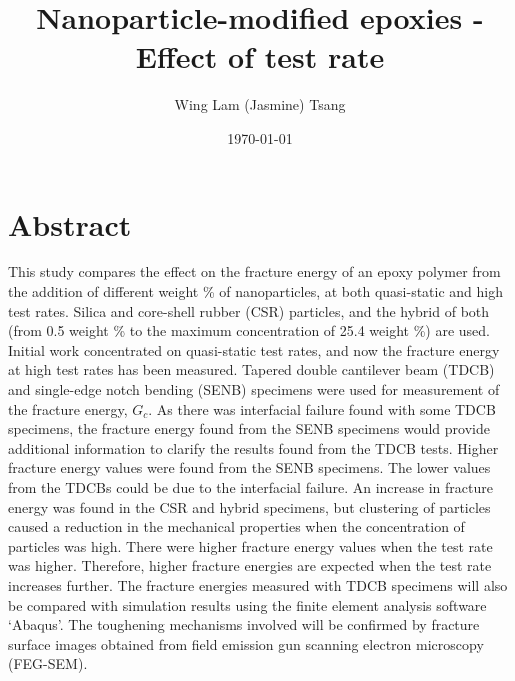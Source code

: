 \documentclass[numbers=noendperiod,chapterprefix=on]{icldt} %
\newcommand{\HRule}{\rule{\linewidth}{0.5mm}}
\begin{document}
\title{Nanoparticle-modified epoxies - Effect of test rate}
\author{Wing Lam (Jasmine) Tsang}
\date{\today}

\maketitle
\newpage


\chapter*{Abstract}

This study compares the effect on the fracture energy of an epoxy polymer from the addition of different weight \% of nanoparticles, at both quasi-static and high test rates. 
Silica and core-shell rubber (CSR) particles, and the hybrid of both (from 0.5 weight \% to the maximum concentration of 25.4 weight \%) are used. Initial work concentrated on quasi-static test rates, and now the fracture energy at high test rates has been measured. Tapered double cantilever beam (TDCB) and single-edge notch bending (SENB) specimens were used for measurement of the fracture energy, $G_c$. As there was interfacial failure found with some TDCB specimens, the fracture energy found from the SENB specimens would provide additional information to clarify the results found from the TDCB tests. Higher fracture energy values were found from the SENB specimens. The lower values from the TDCBs could be due to the interfacial failure. An increase in fracture energy was found in the CSR and hybrid specimens, but clustering of particles caused a reduction in the mechanical properties when the concentration of particles was high. There were higher fracture energy values when the test rate was higher. Therefore, higher fracture energies are expected when the test rate increases further.
The fracture energies measured with TDCB specimens will also be compared with simulation results using the finite element analysis software ‘Abaqus’. The toughening mechanisms involved will be confirmed by fracture surface images obtained from field emission gun scanning electron microscopy (FEG-SEM). 
\end{document}
